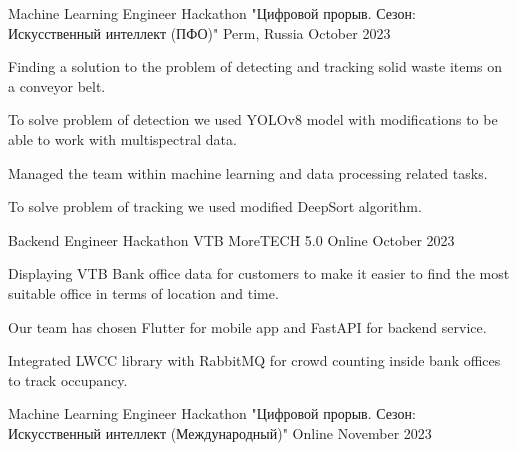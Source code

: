 

\begin{cventries}

\cventry
{Machine Learning Engineer} %
{Hackathon "Цифровой прорыв. Сезон: Искусственный интеллект (ПФО)"} %
{Perm, Russia} %
{October 2023} %
{
  \begin{cvitems} %
    \item {Finding a solution to the problem of detecting and tracking solid waste items on a conveyor belt.}
    \item {To solve problem of detection we used YOLOv8 model with modifications to be able to work with multispectral data. } 
    \item {Managed the team within machine learning and data processing related tasks. }
    \item {To solve problem of tracking we used modified DeepSort algorithm. }
  \end{cvitems}
}
\cventry
{Backend Engineer} %
{Hackathon VTB MoreTECH 5.0} %
{Online} %
{October 2023} %
{
  \begin{cvitems} %
    \item {Displaying VTB Bank office data for customers to make it easier to find the most suitable office in terms of location and time. }
    \item {Our team has chosen Flutter for mobile app and FastAPI for backend service. } 
    \item {Integrated LWCC library with RabbitMQ for crowd counting inside bank offices to track occupancy. }
  \end{cvitems}
}
\cventry
{Machine Learning Engineer} %
{Hackathon "Цифровой прорыв. Сезон: Искусственный интеллект (Международный)"} %
{Online} %
{November 2023} %

\end{cventries}
